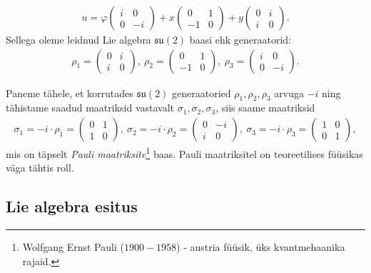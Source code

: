 \documentclass[a4paper,12pt]{article}
\theoremstyle{plain}
\theoremstyle{definition}
\numberwithin{equation}{section}
\def\su2{{\mathfrak{ su}\left(2\right)}}
\begin{document}
\begin{align*}
u = \varphi \begin{pmatrix} i & 0 \\ 0 & -i \end{pmatrix} + x \begin{pmatrix} 0 & 1 \\ -1 & 0 \end{pmatrix} + y \begin{pmatrix} 0 & i \\ i & 0 \end{pmatrix}.
\end{align*}
Sellega oleme leidnud Lie algebra $\su2$ baasi ehk generaatorid:
\begin{align*}
\rho_1 = \begin{pmatrix} 0 & i \\ i & 0 \end{pmatrix},\ \rho_2 = \begin{pmatrix} 0 & 1 \\ -1 & 0 \end{pmatrix},\ \rho_3 = \begin{pmatrix} i & 0 \\ 0 & -i \end{pmatrix}.
\end{align*}

Paneme tähele, et korrutades $\su2$ generaatoried $\rho_1, \rho_2, \rho_3$ arvuga $-i$ ning tähistame saadud maatriksid vastavalt $\sigma_1, \sigma_2, \sigma_3$, siis saame maatriksid
\begin{align*}
\sigma_1 = -i \cdot \rho_1 = \begin{pmatrix} 0 & 1 \\ 1 & 0 \end{pmatrix}, \ \sigma_2 = -i \cdot \rho_2 = \begin{pmatrix} 0 & -i \\ i & 0 \end{pmatrix},\ \sigma_3 = -i \cdot \rho_3 = \begin{pmatrix} 1 & 0 \\ 0 & 1 \end{pmatrix},
\end{align*}
mis on täpselt \emph{Pauli maatriksite}\footnote{Wolfgang Ernst Pauli ($1900 - 1958$) - austria füüsik, üks kvantmehaanika rajaid.} baas. Pauli maatriksitel on teoreetilises füüsikas väga tähtis roll.

\subsection{Lie algebra esitus}
\end{document}
